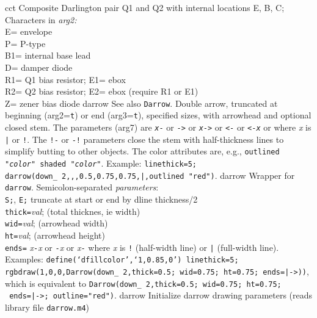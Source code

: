   {cct}%
  {Composite Darlington pair Q1 and Q2 with internal locations E, B, C;
   Characters in {\sl arg2:}\\
   E= envelope\\
   P= P-type\\
   B1= internal base lead\\
   D= damper diode\\
   R1= Q1 bias resistor; E1= ebox\\
   R2= Q2 bias resistor; E2= ebox (require R1 or E1)\\
   Z= zener bias diode 
    }%
%
  {darrow}%
  {See also {\tt Darrow}.
   Double arrow, truncated at beginning (arg2={\tt t}) or
    end (arg3={\tt t}), specified sizes,
    with arrowhead and optional closed stem. The parameters (arg7) are
    {\tt {\sl x}-} or {\tt ->} or {\tt {\sl x}->} or {\tt <-} or
    {\tt <-{\sl x}}
    or {\tt <->} where {\sl x} is {\tt |} or {\tt !}.
    The {\tt !-} or {\tt -!} parameters close
    the stem with half-thickness lines to simplify butting to other objects.
    The color attributes are, e.g.,
    {\tt outlined "{\sl color}" shaded "{\sl color}"}.
    Example:
    {\tt linethick=5; darrow(down\_\ 2,{,},0.5,0.75,0.75,|,outlined "red")}. }%
%
  {darrow}%
  {Wrapper for {\tt darrow}.
  Semicolon-separated {\sl parameters}:\\
    {\tt S;}, {\tt E;} truncate at start or end by dline thickness/2\\
    {\tt thick=}{\sl val};   (total thicknes, ie width)\\
    {\tt wid=}{\sl val};     (arrowhead width)\\
    {\tt ht=}{\sl val};      (arrowhead height)\\
    {\tt ends=}
      {\sl x}{\tt -}{\sl x} or
      {\tt -}{\sl x} or
      {\sl x}{\tt -} where {\sl x} is {\tt !} (half-width line)
       or {\tt |} (full-width line).\\
    Examples:
    {\tt define(`dfillcolor',`1,0.85,0') linethick=5;
     rgbdraw(1,0,0,Darrow(down\_\ 2,thick=0.5; wid=0.75; ht=0.75; ends=|->))},
     which is equivalent to
    {\tt Darrow(down\_\ 2,thick=0.5; wid=0.75; ht=0.75; \
      ends=|->; outline="red")}.  }%
%
  {darrow}%
  {Initialize darrow drawing parameters (reads library file {\tt darrow.m4})}%

